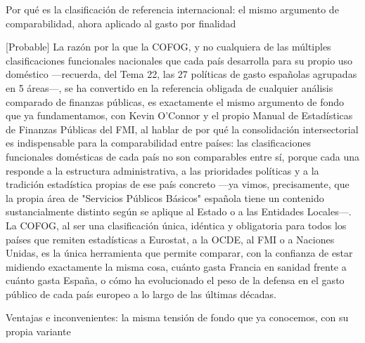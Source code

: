 \documentclass[10pt,a4paper]{article}
\begin{document}
Por qué es la clasificación de referencia internacional: el mismo argumento de comparabilidad, ahora aplicado al gasto por finalidad

[Probable] La razón por la que la COFOG, y no cualquiera de las múltiples clasificaciones funcionales nacionales que cada país desarrolla para su propio uso doméstico —recuerda, del Tema 22, las 27 políticas de gasto españolas agrupadas en 5 áreas—, se ha convertido en la referencia obligada de cualquier análisis comparado de finanzas públicas, es exactamente el mismo argumento de fondo que ya fundamentamos, con Kevin O'Connor y el propio Manual de Estadísticas de Finanzas Públicas del FMI, al hablar de por qué la consolidación intersectorial es indispensable para la comparabilidad entre países: las clasificaciones funcionales domésticas de cada país no son comparables entre sí, porque cada una responde a la estructura administrativa, a las prioridades políticas y a la tradición estadística propias de ese país concreto —ya vimos, precisamente, que la propia área de "Servicios Públicos Básicos" española tiene un contenido sustancialmente distinto según se aplique al Estado o a las Entidades Locales—. La COFOG, al ser una clasificación única, idéntica y obligatoria para todos los países que remiten estadísticas a Eurostat, a la OCDE, al FMI o a Naciones Unidas, es la única herramienta que permite comparar, con la confianza de estar midiendo exactamente la misma cosa, cuánto gasta Francia en sanidad frente a cuánto gasta España, o cómo ha evolucionado el peso de la defensa en el gasto público de cada país europeo a lo largo de las últimas décadas.

Ventajas e inconvenientes: la misma tensión de fondo que ya conocemos, con su propia variante
\end{document}
